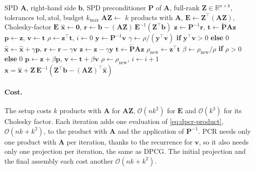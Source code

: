 \begin{algorithm}[h]
  \caption{Deflated preconditioned conjugate residual (DPCR)}
  \label{alg:dpcr}
  \begin{algorithmic}[1]
    \Require SPD $\mathbf{A}$, right-hand side $\mathbf{b}$, SPD preconditioner $\mathbf{P}$ of $\mathbf{A}$, full-rank $\mathbf{Z} \in \mathbb{R}^{n \times k}$, tolerances $\mathrm{tol}, \mathrm{atol}$, budget $k_{\max}$
    \State $\mathbf{A}\mathbf{Z} \gets$ $k$ products with $\mathbf{A}$, \quad $\mathbf{E} \gets \mathbf{Z}^\top(\mathbf{A}\mathbf{Z})$, Cholesky-factor $\mathbf{E}$ 
    \State $\hat{\mathbf{x}} \gets \mathbf{0}$, \quad $\mathbf{r} \gets \mathbf{b} - (\mathbf{A}\mathbf{Z})\,\mathbf{E}^{-1}(\mathbf{Z}^\top\mathbf{b})$ 
    \State $\mathbf{z} \gets \mathbf{P}^{-1}\mathbf{r}$, \quad $\mathbf{t} \gets \tilde{\mathbf{P}}\mathbf{A}\mathbf{z}$ 
    \State $\mathbf{p} \gets \mathbf{z}$, \quad $\mathbf{v} \gets \mathbf{t}$ 
    \State $\rho \gets \mathbf{z}^\top \mathbf{t}$, \quad $i \gets 0$
    \Repeat
      \State $\mathbf{y} \gets \mathbf{P}^{-1}\mathbf{v}$
      \State $\gamma \gets \rho / (\mathbf{y}^\top \mathbf{v})$ \textbf{if} $\mathbf{y}^\top \mathbf{v} > 0$ \textbf{else} $0$
      \State $\hat{\mathbf{x}} \gets \hat{\mathbf{x}} + \gamma \mathbf{p}$, \quad $\mathbf{r} \gets \mathbf{r} - \gamma \mathbf{v}$
      \State $\mathbf{z} \gets \mathbf{z} - \gamma \mathbf{y}$
      \State $\mathbf{t} \gets \tilde{\mathbf{P}}\mathbf{A}\mathbf{z}$ 
      \State $\rho_{\text{new}} \gets \mathbf{z}^\top \mathbf{t}$
      \State $\beta \gets \rho_{\text{new}} / \rho$ \textbf{if} $\rho > 0$ \textbf{else} $0$
      \State $\mathbf{p} \gets \mathbf{z} + \beta \mathbf{p}$, \quad $\mathbf{v} \gets \mathbf{t} + \beta \mathbf{v}$
      \State $\rho \gets \rho_{\text{new}}$, \quad $i \gets i + 1$
     
    \State \Return $\mathbf{x} = \hat{\mathbf{x}} + \mathbf{Z}\,\mathbf{E}^{-1}\left(\mathbf{Z}^\top\mathbf{b} - (\mathbf{A}\mathbf{Z})^\top\hat{\mathbf{x}}\right)$ 
  \end{algorithmic}
\end{algorithm}

\paragraph{Cost.}
The setup costs $k$ products with $\mathbf{A}$ for $\mathbf{A}\mathbf{Z}$,
$\mathcal{O}(nk^2)$ for $\mathbf{E}$ and $\mathcal{O}(k^3)$ for its Cholesky
factor. Each iteration adds one evaluation of \eqref{eq:dpcr-product},
$\mathcal{O}(nk + k^2)$, to the product with $\mathbf{A}$ and the
application of $\mathbf{P}^{-1}$. PCR needs only one product with
$\mathbf{A}$ per iteration, thanks to the recurrence for $\mathbf{v}$, so it
also needs only one projection per iteration, the same as DPCG. The initial
projection and the final assembly each cost another $\mathcal{O}(nk + k^2)$.
